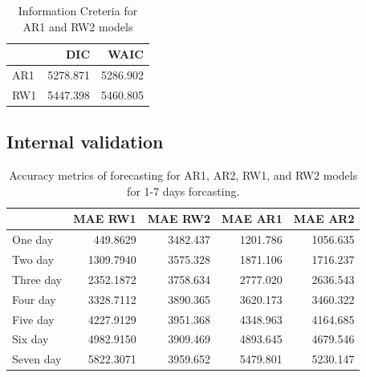 \documentclass[10pt,letterpaper]{article}
\begin{document}
\begin{table}[!h]

\caption{\label{tab:unnamed-chunk-11}Information Creteria for AR1 and RW2 models}
\centering
\begin{tabular}[t]{l|r|r}
\hline
  & DIC & WAIC\\
\hline
AR1 & 5278.871 & 5286.902\\
\hline
RW1 & 5447.398 & 5460.805\\
\hline
\end{tabular}
\end{table}

\hypertarget{internal-validation}{%
\subsection{Internal validation}\label{internal-validation}}

\begin{table}[!h]

\caption{\label{tab:unnamed-chunk-12}Accuracy metrics of forecasting for AR1, AR2, RW1, and RW2 models for 1-7 days forcasting.}
\centering
\begin{tabular}[t]{l|r|r|r|r}
\hline
  & MAE RW1 & MAE RW2 & MAE AR1 & MAE AR2\\
\hline
One day & 449.8629 & 3482.437 & 1201.786 & 1056.635\\
\hline
Two day & 1309.7940 & 3575.328 & 1871.106 & 1716.237\\
\hline
Three day & 2352.1872 & 3758.634 & 2777.020 & 2636.543\\
\hline
Four day & 3328.7112 & 3890.365 & 3620.173 & 3460.322\\
\hline
Five day & 4227.9129 & 3951.368 & 4348.963 & 4164.685\\
\hline
Six day & 4982.9150 & 3909.469 & 4893.645 & 4679.546\\
\hline
Seven day & 5822.3071 & 3959.652 & 5479.801 & 5230.147\\
\hline
\end{tabular}
\end{table}
\end{document}
